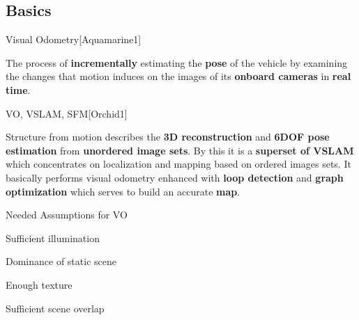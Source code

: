\documentclass[10pt,a4paper]{scrartcl}
\begin{document}
\begin{multicols*}{2}
\subsection*{Basics}

\newcommand{\Definition}{Aquamarine1}%

\newcommand{\Derivation}{Yellow1}%

\newcommand{\Comparison}{Orchid1}%

\newcommand{\Application}{PaleGreen1}%

\begin{QandA}{Visual Odometry}[\Definition]
\item The process of \textbf{incrementally} estimating the \textbf{pose} of the vehicle by examining the changes that motion induces on the images of its \textbf{onboard cameras} in \textbf{real time}.
\end{QandA}

\begin{QandA}{VO, VSLAM, SFM}[\Comparison]
\item Structure from motion describes the \textbf{3D reconstruction} and \textbf{6DOF pose estimation} from \textbf{unordered image sets}. By this it is a \textbf{superset of VSLAM} which concentrates on localization and mapping based on ordered images sets. It basically performs visual odometry enhanced with \textbf{loop detection} and \textbf{graph optimization} which serves to build an accurate \textbf{map}.
\end{QandA}

\begin{QandA}{Needed Assumptions for VO}
\item Sufficient illumination
\item Dominance of static scene
\item Enough texture
\item Sufficient scene overlap 
\end{QandA}


\end{multicols*}
\end{document}
